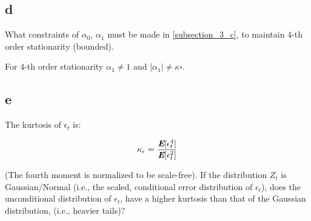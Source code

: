 \subsection{d}
\label{subsection_3_d}
What constraints of $\alpha_0$, $\alpha_1$ must be made in \ref{subsection_3_c}, to maintain 4-th order stationarity (bounded).

\begin{solution}
For 4-th order stationarity $\alpha_1 \ne 1$ and $|\alpha_1| \ne \kappa\square$.

\end{solution}



\subsection{e}
\label{subsection_3_e}
The kurtosis of  $\epsilon_t$ is:

\begin{equation}
\nonumber
\kappa_{\epsilon} = \frac{\textbf{\em E}[\epsilon_t^4]}{\textbf{\em E}[\epsilon_t^2]}
\end{equation}

(The fourth moment is normalized to be scale-free). If the distribution $Z_t$ is Gaussian/Normal 
(i.e., the scaled, conditional error distribution of $\epsilon_t$), does the unconditional distribution of $\epsilon_t$, 
have a higher kurtosis than that of the Gaussian distribution, (i.e., heavier tails)? 

